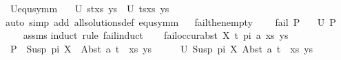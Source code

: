 \begin{isabellebody}
\isanewline
\isanewline
\isanewline
\isanewline
{}\isamarkupfalse%
\ U{\isacharunderscore}{\kern0pt}equ{\isacharunderscore}{\kern0pt}symm{\isacharcolon}{\kern0pt}\isanewline
\ \ \ {\isachardoublequoteopen}U\ {\isacharparenleft}{\kern0pt}s{\isasymapprox}{\isacharquery}{\kern0pt}t{\isacharhash}{\kern0pt}xs{\isacharcomma}{\kern0pt}\ ys{\isacharparenright}{\kern0pt}\ {\isacharequal}{\kern0pt}\ U\ {\isacharparenleft}{\kern0pt}t{\isasymapprox}{\isacharquery}{\kern0pt}s{\isacharhash}{\kern0pt}xs{\isacharcomma}{\kern0pt}\ ys{\isacharparenright}{\kern0pt}{\isachardoublequoteclose}\isanewline
%
\isadelimproof
\ \ %
\endisadelimproof
%
\isatagproof
{}\isamarkupfalse%
{\isacharparenleft}{\kern0pt}auto\ simp\ add{\isacharcolon}{\kern0pt}\ all{\isacharunderscore}{\kern0pt}solutions{\isacharunderscore}{\kern0pt}def\ equ{\isacharunderscore}{\kern0pt}symm{\isacharparenright}{\kern0pt}%
\endisatagproof
{\isafoldproof}%
%
\isadelimproof
\ \isanewline
%
\endisadelimproof
\isanewline
\isanewline
\isanewline
\isanewline
{}\isamarkupfalse%
\ fail{\isacharunderscore}{\kern0pt}then{\isacharunderscore}{\kern0pt}empty{\isacharcolon}{\kern0pt}\ \isanewline
\ \ \ {\isachardoublequoteopen}fail\ P{}{\isachardoublequoteclose}\isanewline
\ \ \ {\isachardoublequoteopen}U\ P{}\ {\isacharequal}{\kern0pt}\ {\isacharbraceleft}{\kern0pt}{\isacharbraceright}{\kern0pt}{\isachardoublequoteclose}\isanewline
%
\isadelimproof
\ \ %
\endisadelimproof
%
\isatagproof
{}\isamarkupfalse%
\ assms\isanewline
{}\isamarkupfalse%
{\isacharparenleft}{\kern0pt}induct\ rule{\isacharcolon}{\kern0pt}\ fail{\isachardot}{\kern0pt}induct{\isacharparenright}{\kern0pt}\isanewline
\ \ \isamarkupfalse%
\ {\isacharparenleft}{\kern0pt}fail{\isacharunderscore}{\kern0pt}occur{\isacharunderscore}{\kern0pt}abst\ X\ t\ pi\ a\ xs\ ys{\isacharparenright}{\kern0pt}\isanewline
\ \ \isamarkupfalse%
\ {\isacharquery}{\kern0pt}P\ {\isacharequal}{\kern0pt}\ {\isachardoublequoteopen}{\isacharparenleft}{\kern0pt}Susp\ pi\ X\ {\isasymapprox}{\isacharquery}{\kern0pt}\ Abst\ a\ t\ {\isacharhash}{\kern0pt}\ xs{\isacharcomma}{\kern0pt}\ ys{\isacharparenright}{\kern0pt}{\isachardoublequoteclose}\isanewline
\ \ \isakeywordONE{{\isacharbraceleft}{\kern0pt}}\isamarkupfalse%
\ \isamarkupfalse%
\ {\isachardoublequoteopen}U\ {\isacharparenleft}{\kern0pt}{\isacharparenleft}{\kern0pt}Susp\ pi\ X{\isacharcomma}{\kern0pt}\ Abst\ a\ t{\isacharparenright}{\kern0pt}\ {\isacharhash}{\kern0pt}\ xs{\isacharcomma}{\kern0pt}\ ys{\isacharparenright}{\kern0pt}\ {\isasymnoteq}\ {\isacharbraceleft}{\kern0pt}{\isacharbraceright}{\kern0pt}{\isachardoublequoteclose}\isanewline

\end{isabellebody}

